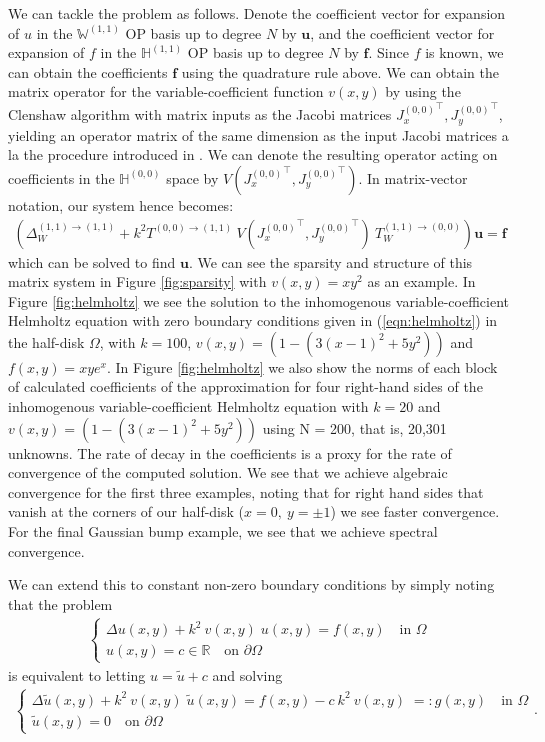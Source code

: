 \documentclass[11pt, oneside]{article}   	%
\newcommand{\R}{\mathbb{R}}
\newcommand{\hdop}{H}
\newcommand{\bighdopii}{{\mathbb{\hdop}^{(1,1)}}}
\newcommand{\bighdopoo}{{\mathbb{\hdop}^{(0,0)}}}
\newcommand{\laplacewii}{\Delta_W^{(1,1)\to(1,1)}}
\newcommand{\bigWii}{{\mathbb{W}^{(1,1)}}}
\begin{document}
We can tackle the problem as follows. Denote the coefficient vector for expansion of $u$ in the $\bigWii$ OP basis up to degree $N$ by $\mathbf{u}$, and the coefficient vector for expansion of $f$ in the $\bighdopii$ OP basis up to degree $N$ by $\mathbf{f}$. Since $f$ is known, we can obtain  the coefficients $\mathbf{f}$ using the quadrature rule above. We can obtain the matrix operator for the variable-coefficient function $v(x,y)$ by using the Clenshaw algorithm with matrix inputs as the Jacobi matrices ${J_x^{(0,0)}}^\top, {J_y^{(0,0)}}^\top$, yielding an operator matrix of the same dimension as the input Jacobi matrices a la the procedure introduced in \cite{olver2019triangle}. We can denote the resulting operator acting on coefficients in the $\bighdopoo$ space by $V({J_x^{(0,0)}}^\top, {J_y^{(0,0)}}^\top)$. In matrix-vector notation, our system hence becomes:
\begin{align*}
    (\laplacewii + k^2 T^{(0,0)\to(1,1)} \: V({J_x^{(0,0)}}^\top, {J_y^{(0,0)}}^\top) \: T_W^{(1,1)\to(0,0)}) \mathbf{u} = \mathbf{f}
\end{align*}
which can be solved to find $\mathbf{u}$. We can see the sparsity and structure of this matrix system in Figure \ref{fig:sparsity} with $v(x,y) = xy^2$ as an example. In Figure \ref{fig:helmholtz} we see the solution to the inhomogenous variable-coefficient Helmholtz equation with zero boundary conditions given in (\ref{eqn:helmholtz}) in the half-disk $\Omega$, with $k=100$, $v(x,y) = (1 - (3(x-1)^2 + 5y^2))$ and $f(x,y) = xy e^x$. In Figure \ref{fig:helmholtz} we also show the norms of each block of calculated coefficients of the approximation for four right-hand sides of the inhomogenous variable-coefficient Helmholtz equation with $k=20$ and $v(x,y) = (1 - (3(x-1)^2 + 5y^2))$ using N = 200, that is, 20,301 unknowns. The rate of decay in the coefficients is a proxy for the rate of convergence of the computed solution. We see that we achieve algebraic convergence for the first three examples, noting that for right hand sides that vanish at the corners of our half-disk ($x=0, \: y = \pm 1$) we see faster convergence. For the final Gaussian bump example, we see that we achieve spectral convergence.

We can extend this to constant non-zero boundary conditions by simply noting that the problem 
\begin{align*}
	\begin{cases}
    		\Delta u(x,y) + k^2 \: v(x,y) \; u(x,y) = f(x,y) \quad \text{in } \Omega \\
		u(x,y) = c \in \R \quad \text{on } \partial \Omega
	\end{cases}
\end{align*}
is equivalent to letting $u = \tilde{u} + c$ and solving
\begin{align*}
	\begin{cases}
    		\Delta \tilde{u}(x,y) + k^2 \: v(x,y) \; \tilde{u}(x,y) = f(x,y) - c \: k^2 \: v(x,y) \; =: g(x,y)  \quad \text{in } \Omega \\
		\tilde{u}(x,y) = 0 \quad \text{on } \partial \Omega
	\end{cases}.
\end{align*}
\end{document}
